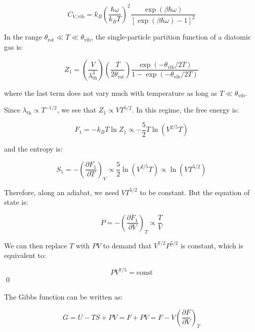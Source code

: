 \documentclass[12pt]{article}
\begin{document}
\begin{equation}
    C_{V,\text{vib}} = k_{B} \left( \frac{\hbar \omega}{k_{B}T} \right)^{2} \frac{\exp\left( \beta \hbar \omega \right)}{\left[ \exp\left( \beta \hbar \omega \right) - 1 \right]^{2}}
\end{equation}


In the range $\theta_{\text{rot}} \ll T \ll \theta_{\text{vib}}$, the single-particle partition function of a diatomic gas is:

\begin{equation}
    Z_{1} = \left( \frac{V}{\lambda_{\text{th}}^{3}} \right) \left( \frac{T}{2  \theta_{\text{rot}}} \right) \frac{\exp\left( -\theta_{\text{vib}}/2T \right)}{1 - \exp\left( -\theta_{\text{vib}}/2T \right)}
\end{equation}

where the last term does not vary much with temperature as long as $T \ll \theta_{\text{vib}}$.

Since $\lambda_{\text{th}} \propto T^{-1/2}$, we see that $Z_{1} \propto VT^{5/2}$. In this regime, the free energy is:

\begin{equation}
    F_{1} = -k_{B}T \ln{Z_{1}} \propto -\frac{5}{2} T \ln{(V^{2/5}T)}
\end{equation}

and the entropy is:

\begin{equation}
    S_{1} = -\left( \frac{\partial F_{1}}{\partial T} \right)_{V} \propto \frac{5}{2} \ln{(V^{2/5}T)} \propto \ln{(VT^{5/2})}
\end{equation}

Therefore, along an adiabat, we need $VT^{5/2}$ to be constant. But the equation of state is:

\begin{equation}
    P = -\left( \frac{\partial F_{1}}{\partial V} \right)_{T} \propto \frac{T}{V}
\end{equation}

We can then replace $T$ with $PV$ to demand that $V^{7/2} P^{5/2}$ is constant, which is equivalent to:

\begin{equation}
    PV^{7/5} = \text{const}
\end{equation}
\qed


The Gibbs function can be written as:

\begin{equation}
    G = U - TS + PV = F + PV = F - V \left( \frac{\partial F}{\partial V} \right)_{T}
\end{equation}
\end{document}
